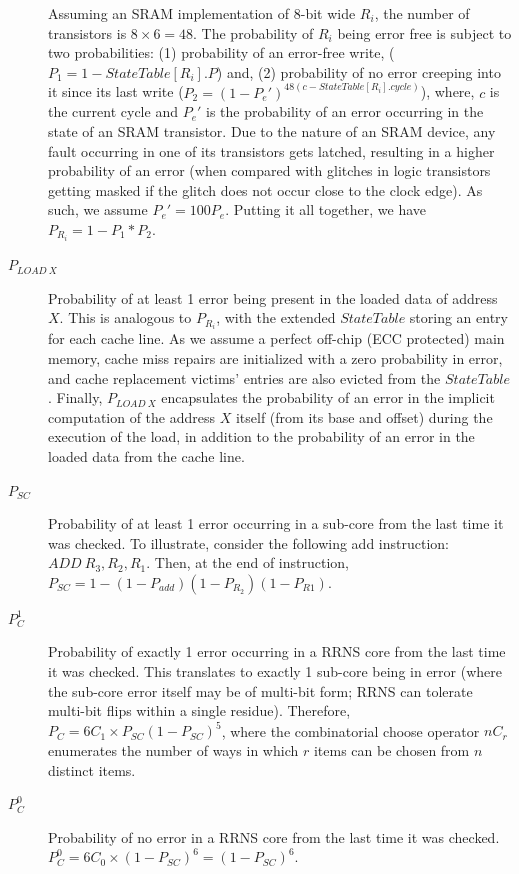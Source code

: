 \documentclass{sig-alternate}
\begin{document}
\begin{description}
Assuming an SRAM implementation of 8-bit wide $R_i$, the number of transistors is $8\times 6=48$. The probability of $R_i$ being error free is subject to two probabilities: (1) probability of an error-free write, ($P_1 = 1 - StateTable[R_i].P$) and, (2) probability of no error creeping into it since its last write ($P_2 = (1 - P_e')^{48(c - StateTable[R_i].cycle)}$), where, $c$ is the current cycle and $P_e'$ is the probability of an error occurring in the state of an SRAM transistor. Due to the nature of an SRAM device, any fault occurring in one of its transistors gets latched, resulting in a higher probability of an error (when compared with glitches in logic transistors getting masked if the glitch does not occur close to the clock edge). As such, we assume $P_e'=100P_e$. Putting it all together, we have $P_{R_i} = 1 - P_1*P_2$.

\item[$P_{LOAD ~X}$]
Probability of at least 1 error being present in the loaded data of address $X$. This is analogous to $P_{R_i}$, with the extended $StateTable$ storing an entry for each cache line. As we assume a perfect off-chip (ECC protected) main memory, cache miss repairs are initialized with a zero probability in error, and cache replacement victims' entries are also evicted from the $StateTable$. Finally, $P_{LOAD~X}$ encapsulates the probability of an error in the implicit computation of the address $X$ itself (from its base and offset) during the execution of the load, in addition to the probability of an error in the loaded data from the cache line.

\item[$P_{SC}$]
Probability of at least 1 error occurring in a sub-core from the last time it was checked. To illustrate, consider the following add instruction: $ADD~R_3,R_2,R_1$. Then, at the end of instruction, $P_{SC}=1-(1-P_{add})(1-P_{R_2})(1-P_{R1})$.

\item[$P_C^{1}$]
Probability of exactly 1 error occurring in a RRNS core from the last time it was checked. This translates to exactly 1 sub-core being in error (where the sub-core error itself may be of multi-bit form; RRNS can tolerate multi-bit flips within a single residue). Therefore, $P_C=6C_1\times P_{SC}(1-P_{SC})^5$, where the combinatorial choose operator $nC_r$ enumerates the number of ways in which $r$ items can be chosen from $n$ distinct items.

\item[$P_C^{0}$]
Probability of no error in a RRNS core from the last time it was checked. $P_C^{0}=6C_0 \times (1-P_{SC})^6 = (1-P_{SC})^6$.


\end{description}
\end{document}

